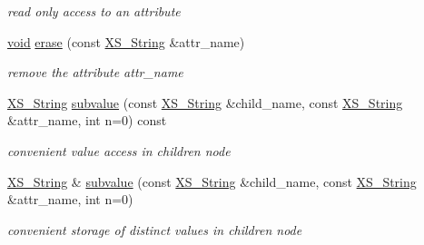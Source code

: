 \begin{DoxyCompactItemize}
\begin{DoxyCompactList}\small\item\em read only access to an attribute \end{DoxyCompactList}\item 
\mbox{\label{struct_x_m_l_storage_1_1_x_m_l_node_abd89af0ed3d827fc49f89c7643ff7666}} 
\hyperlink{interfacevoid}{void} \hyperlink{struct_x_m_l_storage_1_1_x_m_l_node_abd89af0ed3d827fc49f89c7643ff7666}{erase} (const \hyperlink{struct_x_m_l_storage_1_1_x_s___string}{X\+S\+\_\+\+String} \&attr\+\_\+name)
\begin{DoxyCompactList}\small\item\em remove the attribute \textquotesingle{}attr\+\_\+name\textquotesingle{} \end{DoxyCompactList}\item 
\mbox{\label{struct_x_m_l_storage_1_1_x_m_l_node_a94c3779d74da3e4b1660a54b61b5031a}} 
\hyperlink{struct_x_m_l_storage_1_1_x_s___string}{X\+S\+\_\+\+String} \hyperlink{struct_x_m_l_storage_1_1_x_m_l_node_a94c3779d74da3e4b1660a54b61b5031a}{subvalue} (const \hyperlink{struct_x_m_l_storage_1_1_x_s___string}{X\+S\+\_\+\+String} \&child\+\_\+name, const \hyperlink{struct_x_m_l_storage_1_1_x_s___string}{X\+S\+\_\+\+String} \&attr\+\_\+name, int n=0) const
\begin{DoxyCompactList}\small\item\em convenient value access in children node \end{DoxyCompactList}\item 
\mbox{\label{struct_x_m_l_storage_1_1_x_m_l_node_a13ad7552c20d23d0ef0295696b9dc1f8}} 
\hyperlink{struct_x_m_l_storage_1_1_x_s___string}{X\+S\+\_\+\+String} \& \hyperlink{struct_x_m_l_storage_1_1_x_m_l_node_a13ad7552c20d23d0ef0295696b9dc1f8}{subvalue} (const \hyperlink{struct_x_m_l_storage_1_1_x_s___string}{X\+S\+\_\+\+String} \&child\+\_\+name, const \hyperlink{struct_x_m_l_storage_1_1_x_s___string}{X\+S\+\_\+\+String} \&attr\+\_\+name, int n=0)
\begin{DoxyCompactList}\small\item\em convenient storage of distinct values in children node \end{DoxyCompactList}\item 
\mbox{\label{struct_x_m_l_storage_1_1_x_m_l_node_a49014cb77ddb317fe288919b21bfaa66}} 

\end{DoxyCompactItemize}
